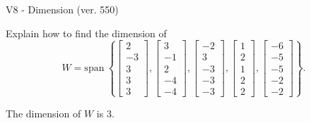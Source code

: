 \begin{exercise}
  \begin{exerciseTitle}V8 - Dimension (ver. 550)\end{exerciseTitle}
  \begin{exerciseStatement}
    Explain how to find the dimension of 
\[W=\mathrm{span}\ \left\{\left[\begin{array}{r}
2 \\
-3 \\
3 \\
3 \\
3
\end{array}\right] , \left[\begin{array}{r}
3 \\
-1 \\
2 \\
-4 \\
-4
\end{array}\right] , \left[\begin{array}{r}
-2 \\
3 \\
-3 \\
-3 \\
-3
\end{array}\right] , \left[\begin{array}{r}
1 \\
2 \\
1 \\
2 \\
2
\end{array}\right] , \left[\begin{array}{r}
-6 \\
-5 \\
-5 \\
-2 \\
-2
\end{array}\right]\right\}.\]



  \end{exerciseStatement}
  \begin{exerciseAnswer}
   The dimension of \(W\) is  \(3\).
  


  \end{exerciseAnswer}
\end{exercise}